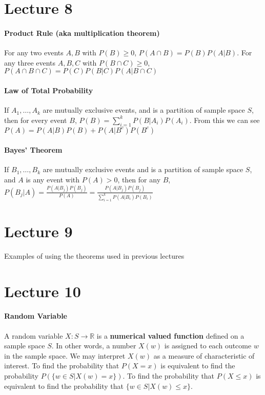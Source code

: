\documentclass[10pt,letter]{article}
\begin{document}
\section*{Lecture 8}
\paragraph{Product Rule (aka multiplication theorem)}
For any two events $A,B$ with $P(B)\geq0$, $P(A\cap B)=P(B)P(A|B)$. For any three events $A,B,C$ with $P(B\cap C)\geq0$, $P(A\cap B\cap C)=P(C)P(B|C)P(A|B\cap C)$

\paragraph{Law of Total Probability}
If $A_1,\ldots,A_k$ are mutually exclusive events, and is a partition of sample space $S$, then for every event $B$, $P(B)=\sum_{i=1}^kP(B|A_i)P(A_i)$. From this we can see $P(A)=P(A|B)P(B)+P(A|B^c)P(B^c)$ 

\paragraph{Bayes' Theorem}
If $B_1,\ldots,B_k$ are mutually exclusive events and is a partition of sample space $S$, and $A$ is any event with $P(A)>0$, then for any $B$, $P(B_j|A)=\frac{P(A|B_j)P(B_j)}{P(A)}=\frac{P(A|B_j)P(B_j)}{\sum_{i=1}^kP(A|B_i)P(B_i)}$

\section*{Lecture 9}
Examples of using the theorems used in previous lectures

\section*{Lecture 10}
\paragraph{Random Variable}
A random variable $X:S\rightarrow\mathbb{R}$ is a \textbf{numerical valued function} defined on a sample space $S$. In other words, a number $X(w)$ is assigned to each outcome $w$ in the sample space. We may interpret $X(w)$ as a measure of characteristic of interest. To find the probability that $P(X=x)$ is equivalent to find the probability $P(\{w\in S|X(w)=x\})$. To find the probability that $P(X\leq x)$ is equivalent to find the probability that $\{w\in S|X(w)\leq x\}$. 
\end{document}
